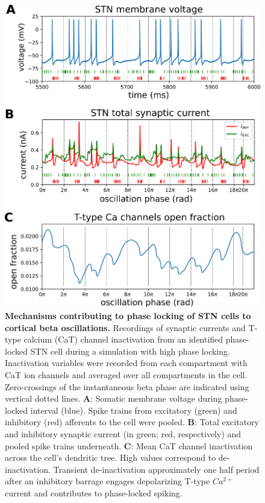 %
\begin{figure}
\centering
\includegraphics[height=\dimexpr \textheight - 15\baselineskip\relax]{ch_detailed_model/figs/fig_cell-phaselocking-mechanisms.png}
\caption{\textbf{Mechanisms contributing to phase locking of STN cells to cortical beta oscillations.} Recordings of synaptic currents and T-type calcium (CaT) channel inactivation from an identified phase-locked STN cell during a simulation with high phase locking. Inactivation variables were recorded from each compartment with CaT ion channels and averaged over all compartments in the cell. Zero-crossings of the instantaneous beta phase are indicated using vertical dotted lines. \textbf{A}: Somatic membrane voltage during phase-locked interval (blue). Spike trains from excitatory (green) and inhibitory (red) afferents to the cell were pooled. \textbf{B}: Total excitatory and inhibitory synaptic current (in green; red, respectively) and pooled spike trains underneath. \textbf{C}: Mean CaT channel inactivation across the cell's dendritic tree. High values correspond to de-inactivation. Transient de-inactivation approximately one half period after an inhibitory barrage engages depolarizing T-type $Ca^{2+}$ current and contributes to phase-locked spiking.}
\label{fig:cell-phaselocking-mechanisms}
\end{figure}

